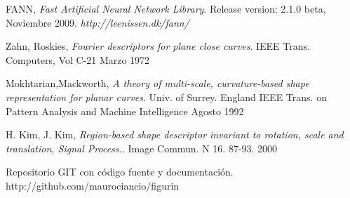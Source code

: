 \documentclass[pdftex,a4paper,10.5pt]{article}
\begin{document}
\begin{thebibliography}{9}
  FANN, 
  \emph{Fast Artificial Neural Network Library}. 
  Release version: 2.1.0 beta, 
  Noviembre 2009.
  \textsl{http://leenissen.dk/fann/}
 
  Zahn, Roskies, 
  \emph{Fourier descriptors for plane close curves}. 
  IEEE Trans. Computers, Vol C-21
  Marzo 1972

 Mokhtarian,Mackworth,
  \emph{A theory of multi-scale, curvature-based shape representation for planar curves}. 
  Univ. of Surrey. England
  IEEE Trans. on Pattern Analysis and Machine Intelligence
  Agosto 1992

  H. Kim, J. Kim,
  \emph{Region-based shape descriptor invariant to rotation, scale and translation, Signal Process.}. 
  Image Commun. N 16. 87-93.
  2000

	Repositorio GIT con c\'odigo fuente y documentaci\'on. http://github.com/maurociancio/figurin
  
\end{thebibliography}

\end{document}
